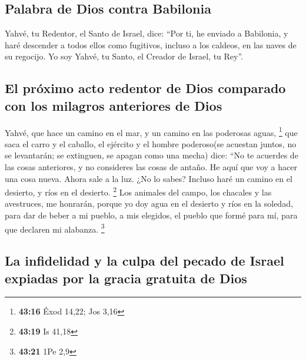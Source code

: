 \begin{paracol}{2}
\hypertarget{palabra-de-dios-contra-babilonia}{%
\subsection{Palabra de Dios contra
Babilonia}\label{palabra-de-dios-contra-babilonia}}

 Yahvé, tu Redentor, el Santo de Israel, dice: ``Por ti,
he enviado a Babilonia, y haré descender a todos ellos como fugitivos,
incluso a los caldeos, en las naves de su regocijo.  Yo
soy Yahvé, tu Santo, el Creador de Israel, tu Rey''.

\hypertarget{el-pruxf3ximo-acto-redentor-de-dios-comparado-con-los-milagros-anteriores-de-dios}{%
\subsection{El próximo acto redentor de Dios comparado con los milagros
anteriores de
Dios}\label{el-pruxf3ximo-acto-redentor-de-dios-comparado-con-los-milagros-anteriores-de-dios}}

 Yahvé, que hace un camino en el mar, y un camino en las
poderosas aguas, \footnote{\textbf{43:16} Éxod 14,22; Jos 3,16}
 que saca el carro y el caballo, el ejército y el hombre
poderoso(se acuestan juntos, no se levantarán; se extinguen, se apagan
como una mecha) dice:  ``No te acuerdes de las cosas
anteriores, y no consideres las cosas de antaño.  He aquí
que voy a hacer una cosa nueva. Ahora sale a la luz. ¿No lo sabes?
Incluso haré un camino en el desierto, y ríos en el desierto.
\footnote{\textbf{43:19} Is 41,18}  Los animales del
campo, los chacales y las avestruces, me honrarán, porque yo doy agua en
el desierto y ríos en la soledad, para dar de beber a mi pueblo, a mis
elegidos,  el pueblo que formé para mí, para que declaren
mi alabanza. \footnote{\textbf{43:21} 1Pe 2,9}

\hypertarget{la-infidelidad-y-la-culpa-del-pecado-de-israel-expiadas-por-la-gracia-gratuita-de-dios}{%
\subsection{La infidelidad y la culpa del pecado de Israel expiadas por
la gracia gratuita de
Dios}\label{la-infidelidad-y-la-culpa-del-pecado-de-israel-expiadas-por-la-gracia-gratuita-de-dios}}


\end{paracol}
